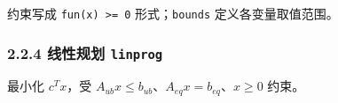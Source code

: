 \begin{Shaded}
\begin{Highlighting}[]
\OperatorTok{=}\NormalTok{ [\{}\NormalTok{: }\NormalTok{, }\NormalTok{: }\NormalTok{ x: x[}\NormalTok{] }\OperatorTok{+}\NormalTok{ x[}\NormalTok{] }\OperatorTok{{-}} \NormalTok{\}]}
\OperatorTok{=}\NormalTok{ x: x[}\NormalTok{]}\OperatorTok{**} \OperatorTok{+}\NormalTok{ x[}\NormalTok{]}\OperatorTok{**}\NormalTok{, [}\NormalTok{, }\NormalTok{], method}\OperatorTok{=}\NormalTok{,}
\OperatorTok{=}\OperatorTok{=}\NormalTok{[(}\NormalTok{, }\NormalTok{), (}\NormalTok{, }\NormalTok{)])}
\end{Highlighting}
\end{Shaded}

\begin{Shaded}
\begin{Highlighting}[]
\end{Highlighting}
\end{Shaded}

约束写成 \texttt{fun(x)\ \textgreater{}=\ 0} 形式；\texttt{bounds}
定义各变量取值范围。

\subsubsection{\texorpdfstring{2.2.4 线性规划
\texttt{linprog}}{2.2.4 线性规划 linprog}}\label{ux7ebfux6027ux89c4ux5212-linprog}

最小化 \(c^T x\)，受
\(A_{ub}x\le b_{ub}\)、\(A_{eq}x=b_{eq}\)、\(x\ge0\) 约束。

